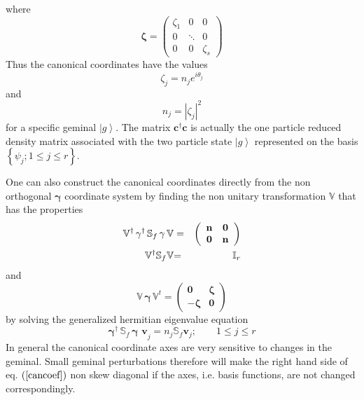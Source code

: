 \documentclass{article}
\begin{document}
where 
\begin{equation}
\mathbf{\zeta =}\left( 
\begin{array}{ccc}
\zeta _{1} & 0 & 0 \\ 
0 & \ddots & 0 \\ 
0 & 0 & \zeta _{s}%
\end{array}%
\right)
\end{equation}%
Thus the canonical coordinates have the values 
\begin{equation}
\zeta _{j}=n_{j}e^{i\theta _{j}}
\end{equation}%
and 
\begin{equation}
n_{j}=\left| \zeta _{j}\right| ^{2}
\end{equation}%
for a specific geminal $\left| g\right\rangle $. The matrix $\mathbf{c}%
^{\dagger }\mathbf{c}$ is actually the one particle reduced density matrix
associated with the two particle state $\left| g\right\rangle $ represented
on the basis $\left\{ \psi _{j};1\leq j\leq r\right\} $.

One can also construct the canonical coordinates directly from the non
orthogonal $\mathbf{\gamma }$ coordinate system by finding the non unitary
transformation $\mathbb{V}$ that has the properties 
\begin{eqnarray}
\mathbb{V}^{\dagger }\,\mathbf{\gamma }^{\dagger }\,\mathbb{S}_{f}\,\mathbf{%
\gamma \,}\mathbb{V} &=&\left( 
\begin{array}{cc}
\mathbf{n} & \mathbf{0} \\ 
\mathbf{0} & \mathbf{n}%
\end{array}%
\right)  \notag \\
\mathbb{V}^{\dagger }\mathbb{S}_{f}\mathbb{V} &\mathbb{=}&\mathbb{I}_{r}
\end{eqnarray}%
and 
\begin{equation}
\mathbb{V\,}\mathbf{\gamma \,}\mathbb{V}^{t}=\left( 
\begin{array}{cc}
\mathbf{0} & \mathbf{\zeta } \\ 
-\mathbf{\zeta } & \mathbf{0}%
\end{array}%
\right)
\end{equation}%
by solving the generalized hermitian eigenvalue equation 
\begin{equation}
\mathbf{\gamma }^{\dagger }\,\mathbb{S}_{f}\,\mathbf{\gamma \,\,v}_{j}=n_{j}%
\mathbb{S}_{f}\mathbf{v}_{j};\qquad 1\leq j\leq r
\end{equation}%
In general the canonical coordinate axes are very sensitive to changes in
the geminal. Small geminal perturbations therefore will make the right hand
side of eq. $\left( \ref{cancoef}\right) $ non skew diagonal if the axes,
i.e. basis functions, are not changed correspondingly.
\end{document}

